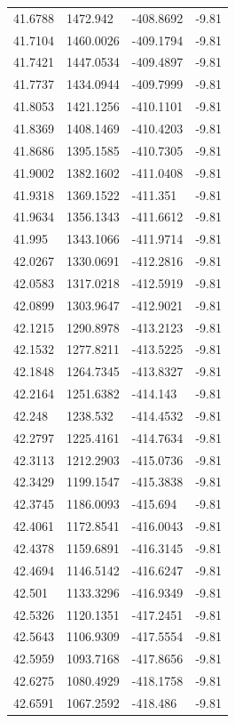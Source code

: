 \begin{table}[H]
\begin{tabular}{llll}
41.6788 & 1472.942 & -408.8692 & -9.81 \\
41.7104 & 1460.0026 & -409.1794 & -9.81 \\
41.7421 & 1447.0534 & -409.4897 & -9.81 \\
41.7737 & 1434.0944 & -409.7999 & -9.81 \\
41.8053 & 1421.1256 & -410.1101 & -9.81 \\
41.8369 & 1408.1469 & -410.4203 & -9.81 \\
41.8686 & 1395.1585 & -410.7305 & -9.81 \\
41.9002 & 1382.1602 & -411.0408 & -9.81 \\
41.9318 & 1369.1522 & -411.351 & -9.81 \\
41.9634 & 1356.1343 & -411.6612 & -9.81 \\
41.995 & 1343.1066 & -411.9714 & -9.81 \\
42.0267 & 1330.0691 & -412.2816 & -9.81 \\
42.0583 & 1317.0218 & -412.5919 & -9.81 \\
42.0899 & 1303.9647 & -412.9021 & -9.81 \\
42.1215 & 1290.8978 & -413.2123 & -9.81 \\
42.1532 & 1277.8211 & -413.5225 & -9.81 \\
42.1848 & 1264.7345 & -413.8327 & -9.81 \\
42.2164 & 1251.6382 & -414.143 & -9.81 \\
42.248 & 1238.532 & -414.4532 & -9.81 \\
42.2797 & 1225.4161 & -414.7634 & -9.81 \\
42.3113 & 1212.2903 & -415.0736 & -9.81 \\
42.3429 & 1199.1547 & -415.3838 & -9.81 \\
42.3745 & 1186.0093 & -415.694 & -9.81 \\
42.4061 & 1172.8541 & -416.0043 & -9.81 \\
42.4378 & 1159.6891 & -416.3145 & -9.81 \\
42.4694 & 1146.5142 & -416.6247 & -9.81 \\
42.501 & 1133.3296 & -416.9349 & -9.81 \\
42.5326 & 1120.1351 & -417.2451 & -9.81 \\
42.5643 & 1106.9309 & -417.5554 & -9.81 \\
42.5959 & 1093.7168 & -417.8656 & -9.81 \\
42.6275 & 1080.4929 & -418.1758 & -9.81 \\
42.6591 & 1067.2592 & -418.486 & -9.81 \\

\end{tabular}
\end{table}

